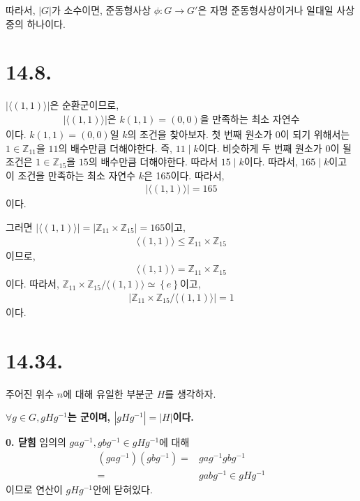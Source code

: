 \documentclass{article}
\begin{document}
따라서, $\left|G\right|$가 소수이면, 준동형사상 $\phi : G \rightarrow G'$은 자명 준동형사상이거나 일대일 사상 중의 하나이다.

\section{14.8.}
$\left|\langle (1, 1) \rangle\right|$은 순환군이므로,
\begin{align*}
\left|\langle (1, 1) \rangle\right|\text{은 } k(1, 1) = (0, 0)\text{을 만족하는 최소 자연수}
\end{align*}이다. $k(1, 1) = (0, 0)$일 $k$의 조건을 찾아보자. 첫 번째 원소가 $0$이 되기 위해서는 $1 \in \mathbb{Z}_{11}$을 $11$의 배수만큼 더해야한다. 즉, $11 \mid k$이다. 비슷하게 두 번째 원소가 $0$이 될 조건은 $1 \in \mathbb{Z}_{15}$을 $15$의 배수만큼 더해야한다. 따라서 $15 \mid k$이다. 따라서, $165 \mid k$이고 이 조건을 만족하는 최소 자연수 $k$은 165이다. 따라서,
\begin{align*}
\left|\langle (1, 1) \rangle\right| = 165
\end{align*}이다. 

그러면 $\left|\langle (1, 1) \rangle\right| = \left|\mathbb{Z}_{11} \times \mathbb{Z}_{15}\right| = 165$이고,
\begin{align*}
\langle (1, 1) \rangle \le \mathbb{Z}_{11} \times \mathbb{Z}_{15}
\end{align*}이므로,
\begin{align*}
\langle (1, 1) \rangle = \mathbb{Z}_{11} \times \mathbb{Z}_{15}
\end{align*}이다. 따라서, $\mathbb{Z}_{11} \times \mathbb{Z}_{15} / \langle (1, 1) \rangle \simeq \left\{e\right\}$이고,
\begin{align*}
\left| \mathbb{Z}_{11} \times \mathbb{Z}_{15} / \langle (1, 1) \rangle \right| = 1
\end{align*}이다.

\section{14.34.}
주어진 위수 $n$에 대해 유일한 부분군 $H$를 생각하자.

\textbf{$\forall g \in G, gHg^{-1}$는 군이며, $\left|gHg^{-1}\right| = \left|H\right|$이다.}

\textbf{0. 닫힘} 임의의 $gag^{-1}, gbg^{-1} \in gHg^{-1}$에 대해
\begin{align*}
(gag^{-1})(gbg^{-1}) =& gag^{-1}gbg^{-1}
\\ =& gabg^{-1} \in gHg^{-1} \tag{$ab \in H$}
\end{align*}이므로 연산이 $gHg^{-1}$안에 닫혀있다.
\end{document}
